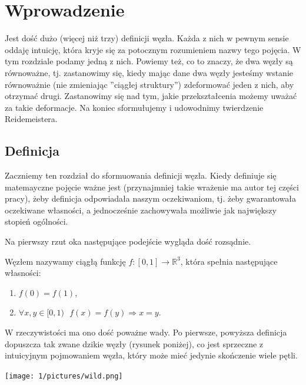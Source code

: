 \newpage

\section{Wprowadzenie}

Jest dość dużo (więcej niż trzy) definicji węzła. Każda z nich w pewnym sensie oddaję intuicję, która kryje się za potocznym rozumieniem nazwy tego pojęcia. W tym rozdziale podamy 
jedną z nich. 
Powiemy też, co to znaczy, że dwa węzły są równoważne, tj. zastanowimy się, kiedy mając dane dwa węzły jesteśmy wstanie równoważnie (nie zmieniając ''ciągłej struktury'') 
zdeformować jeden z nich, aby otrzymać drugi. Zastanowimy się nad tym, jakie przekształcenia możemy uważać za takie deformacje. Na koniec sformułujemy i udowodnimy 
twierdzenie Reidemeistera.

\subsection{Definicja}

Zaczniemy ten rozdział do sformuowania definicji węzła. Kiedy definiuje się matemayczne pojęcie ważne jest (przynajmniej takie wrażenie ma autor tej części pracy), 
żeby definicja odpowiadała naszym oczekiwaniom, tj. żeby gwarantowała oczekiwane własności, a jednocześnie zachowywała możliwie jak największy 
stopień ogólności. 

Na pierwszy rzut oka następujące podejście wygląda dość rozsądnie.


\begin{definicja}
\label{zla_definicja}
 Węzłem nazywamy ciągłą funkcję $f\colon[0,1]\to\mathbb{R}^3$, która spełnia następujące własności:
 \begin{enumerate}
  \item $f(0) = f(1)$,
  \item $\forall x,y\in[0,1) \ \ \ f(x) = f(y)\Rightarrow x = y$.
 \end{enumerate}
\end{definicja}

W rzeczywistości ma ono dość poważne wady.
Po pierwsze, powyższa definicja dopuszcza tak zwane dzikie węzły (rysunek poniżej), co jest sprzeczne z intuicyjnym pojmowaniem węzła, który może mieć 
jedynie skończenie wiele pętli. 


	\begin{center}

	\texttt{[image: 1/pictures/wild.png]}
	\end{center}



